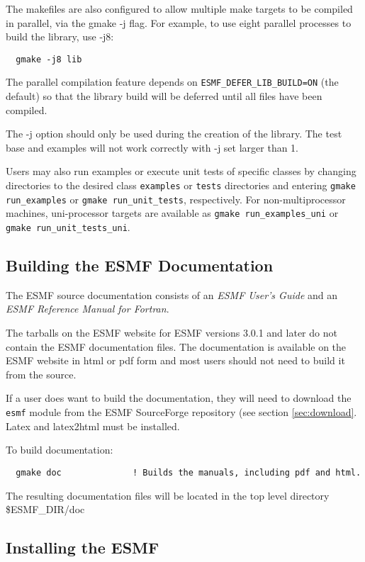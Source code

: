 The makefiles are also configured to allow multiple make targets to be
compiled in parallel, via the gmake -j flag.  For example, to use eight
parallel processes to build the library, use -j8:
\begin{verbatim}
  gmake -j8 lib
\end{verbatim}

The parallel compilation feature depends on {\tt ESMF\_DEFER\_LIB\_BUILD=ON}
(the default) so that the library build will be deferred until all files
have been compiled.

The -j option should only be used during the creation of the library.
The test base and examples will not work correctly with -j set larger
than 1.

Users may also run examples or execute unit tests of specific classes
by changing directories to the desired class {\tt examples} or {\tt tests} 
directories and entering {\tt gmake run\_examples} or 
{\tt gmake run\_unit\_tests}, respectively.  For non-multiprocessor machines,
uni-processor targets are available as {\tt gmake run\_examples\_uni} or
{\tt gmake run\_unit\_tests\_uni}.

\subsection{Building the ESMF Documentation}
\label{BuildDocumentation}

The ESMF source documentation consists of an {\it ESMF User's Guide}
and an {\it ESMF Reference Manual for Fortran}.

The tarballs on the ESMF website for ESMF versions 3.0.1 and later do
not contain the ESMF documentation files.  The documentation is 
available on the ESMF website in html or pdf form and most users should
not need to build it from the source.

If a user does want to build the documentation, they will need to 
download the {\tt esmf} module from the ESMF SourceForge repository
(see section \ref{sec:download}.  Latex and latex2html must be
installed.

\noindent To build documentation:
\begin{verbatim}
  gmake doc              ! Builds the manuals, including pdf and html.
\end{verbatim}

\noindent The resulting documentation files will be
located in the top level directory \${ESMF\_DIR}/doc

\subsection{Installing the ESMF}
\label{InstallESMF}

